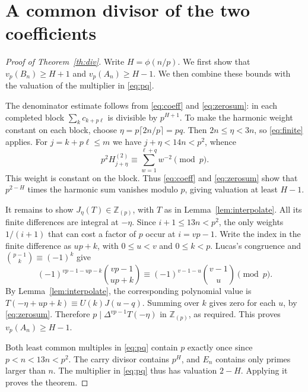 \documentclass[11pt]{article}
\newcommand{\Zp}{\mathbb Z_{(p)}}
\newcommand{\val}{v_p}
\begin{document}
\section{A common divisor of the two coefficients}
\begin{proof}[Proof of Theorem~\ref{th:div}]
Write $H=\phi(n/p)$. We first show that $v_p(B_n)\ge H+1$
and $v_p(A_n)\ge H-1$. We then combine these bounds with the valuation of the
multiplier in \eqref{eq:pq}.

The denominator estimate follows from \eqref{eq:coeff} and
\eqref{eq:zerosum}: in each completed block $\sum_k c_{k+p\ell}$
is divisible by $p^{H+1}$. To make the harmonic weight constant on
each block, choose
$\eta=p\lceil2n/p\rceil=pq$. Then $2n\le\eta<3n$, so \eqref{eq:finite}
applies. For $j=k+p\ell\le m$ we have $j+\eta<14n<p^2$, whence
\[
 p^2 H_{j+\eta}^{(2)}\equiv\sum_{w=1}^{\ell+q}w^{-2}\pmod p .
\]
This weight is constant on the block. Thus \eqref{eq:coeff} and
\eqref{eq:zerosum} show that $p^{2-H}$ times the harmonic sum vanishes
modulo $p$, giving valuation at least $H-1$.

It remains to show $J_\eta(T)\in\Zp$, with $T$ as in
Lemma~\ref{lem:interpolate}. All its finite differences are integral
at $-\eta$. Since $i+1\le13n<p^2$, the only weights $1/(i+1)$
that can cost a factor of $p$ occur at $i=vp-1$. Write the index in
the finite difference as $up+k$, with $0\le u<v$ and $0\le k<p$.
Lucas's congruence and $\binom{p-1}{k}\equiv(-1)^k$ give
\[
 (-1)^{vp-1-up-k}\binom{vp-1}{up+k}
       \equiv(-1)^{v-1-u}\binom{v-1}{u}\pmod p .
\]
By Lemma~\ref{lem:interpolate}, the corresponding polynomial value
is $T(-\eta+up+k)\equiv U(k)J(u-q)$. Summing over $k$ gives zero
for each $u$, by \eqref{eq:zerosum}. Therefore
$p\mid\Delta^{vp-1}T(-\eta)$ in $\Zp$, as required. This proves
$\val(A_n)\ge H-1$.

Both least common multiples in \eqref{eq:pq} contain $p$ exactly once since
$p<n<13n<p^2$. The carry divisor contains $p^H$, and $E_n$ contains
only primes larger than $n$. The multiplier in \eqref{eq:pq} thus
has valuation $2-H$. Applying it proves the theorem.
\end{proof}
\end{document}
